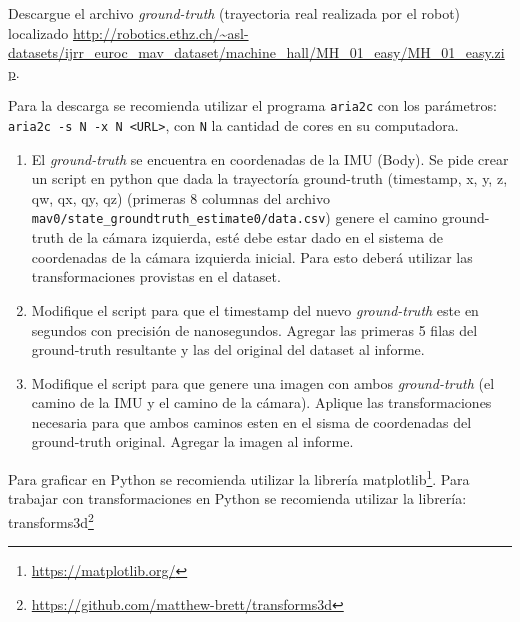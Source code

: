 \documentclass[tp]{lcc}
\begin{document}
Descargue el archivo \emph{ground-truth} (trayectoria real realizada por el robot) localizado \url{http://robotics.ethz.ch/~asl-datasets/ijrr_euroc_mav_dataset/machine_hall/MH_01_easy/MH_01_easy.zip}.

\begin{nota}
	Para la descarga se recomienda utilizar el programa \lstinline{aria2c} con los parámetros: \lstinline{aria2c -s N -x N <URL>}, con \lstinline{N} la cantidad de cores en su computadora.
\end{nota}

\begin{enumerate}
    \item El \emph{ground-truth} se encuentra en coordenadas de la IMU (Body). Se pide crear un script en python que dada la trayectoría ground-truth (timestamp, x, y, z, qw, qx, qy, qz) (primeras 8 columnas del archivo \lstinline{mav0/state_groundtruth_estimate0/data.csv}) genere el camino ground-truth de la cámara izquierda, esté debe estar dado en el sistema de coordenadas de la cámara izquierda inicial. Para esto deberá utilizar las transformaciones provistas en el dataset.
    
    \item Modifique el script para que el timestamp del nuevo \emph{ground-truth} este en segundos con precisión de nanosegundos. Agregar las primeras 5 filas del ground-truth resultante y las del original del dataset al informe.
    
    \item Modifique el script para que genere una imagen con ambos \emph{ground-truth} (el camino de la IMU y el camino de la cámara). Aplique las transformaciones necesaria para que ambos caminos esten en el sisma de coordenadas del ground-truth original. Agregar la imagen al informe.
\end{enumerate}

\begin{nota}
	Para graficar en Python se recomienda utilizar la librería matplotlib\footnote{\url{https://matplotlib.org/}}. Para trabajar con transformaciones en Python se recomienda utilizar la librería: transforms3d\footnote{\url{https://github.com/matthew-brett/transforms3d}}
\end{nota}
\end{document}
